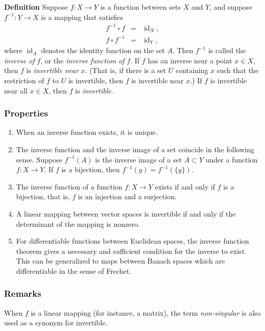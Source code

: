 \documentclass[12pt]{article}
\begin{document}
{\bf Definition}
Suppose $f:X\to Y$ is a function between sets $X$ and $Y$,
and suppose $f^{-1}:Y\to X$ is a mapping that satisfies 
\begin{eqnarray*}
f^{-1}\circ f &=& \operatorname{id}_X, \\
f\circ f^{-1} &=& \operatorname{id}_Y,
\end{eqnarray*}
where $\operatorname{id}_A$ denotes the identity function on the set $A$.
Then $f^{-1}$ is called the \emph{inverse of} $f$,
or the \emph{inverse function of} $f$. 
If $f$ has an inverse near a point $x\in X$, then $f$ is 
\emph{invertible near $x$}. (That is, if there is a set $U$ containing $x$
such that the restriction of $f$ to $U$ is invertible, then $f$ is invertible
near $x$.) If $f$ is invertible near all $x\in X$, then
$f$ is \emph{invertible}. 

\subsubsection*{Properties}
\begin{enumerate}
\item When an inverse function exists, it is unique.
\item The inverse function and the inverse image of a set coincide 
in the following sense. 
Suppose $f^{-1}(A)$ is the inverse image of a set $A\subset Y$
under a function $f:X\to Y$. 
If $f$ is a bijection, then $f^{-1}(y)=f^{-1}(\{y\})$. 
\item The inverse function of a function $f:X\to Y$ exists if and only
if $f$ is a bijection, that is, $f$ is an injection and a surjection. 
\item A linear mapping between vector spaces is invertible if and only if 
the determinant of the mapping is nonzero. 
\item For differentiable functions between Euclidean spaces, the inverse function 
theorem gives a necessary and sufficient condition for the inverse to exist. 
This can be generalized to maps between Banach spaces which are differentiable
in the sense of Frechet.
\end{enumerate}

\subsubsection*{Remarks}
When $f$ is a linear mapping (for instance, a matrix), the term \emph{non-singular} is 
also used as a synonym for invertible.
\end{document}
